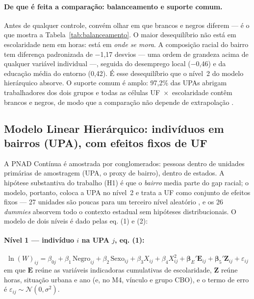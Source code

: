 \documentclass[12pt, a4paper, oneside]{article}
\let\oldsubsectionFB\subsection
\renewcommand{\subsection}{\FloatBarrier\oldsubsectionFB}
\begin{document}
\paragraph{De que é feita a comparação: balanceamento e suporte comum.}
Antes de qualquer controle, convém olhar em que brancos e negros diferem --- é o que
mostra a Tabela~\ref{tab:balanceamento}. O maior desequilíbrio não está em escolaridade
nem em horas: está em \emph{onde se mora}. A composição racial do bairro tem diferença
padronizada de −1,17 desvios --- uma ordem de grandeza acima de qualquer variável
individual ---, seguida do desemprego local (−0,46) e da educação média do entorno
(0,42). É esse desequilíbrio que o nível~2 do modelo hierárquico absorve.
O suporte comum é amplo: 97,2\% das UPAs abrigam trabalhadores dos dois
grupos e todas as células UF~$\times$~escolaridade contêm brancos e negros, de modo que a
comparação não depende de extrapolação \cite{angrist2009}.


\subsection{Modelo Linear Hierárquico: indivíduos em bairros (UPA), com efeitos fixos de UF}
\label{subsec:hlm}

A PNAD Contínua é amostrada por conglomerados: pessoas dentro de unidades primárias de
amostragem (UPA, o proxy de bairro), dentro de estados. A hipótese substantiva do
trabalho (H1) é que o \emph{bairro} media parte do gap racial; o modelo, portanto, coloca
a UPA no nível~2 e trata a UF como conjunto de efeitos fixos --- 27 unidades são poucas para
um terceiro nível aleatório \cite{angrist2009}, e os 26 \emph{dummies} absorvem todo o
contexto estadual sem hipóteses distribucionais. O modelo de dois níveis é dado pelas eq. (1) e (2):

\paragraph{Nível 1 --- indivíduo $i$ na UPA $j$, eq. (1):}
\begin{equation}
  \ln(W)_{ij} = \beta_{0j} + \beta_1\,\text{Negro}_{ij} + \beta_2\,\text{Sexo}_{ij}
  + \beta_3 X_{ij} + \beta_4 X^2_{ij} + \boldsymbol{\beta}_{E}'\mathbf{E}_{ij}
  + \boldsymbol{\beta}_{5}'\mathbf{Z}_{ij} + \varepsilon_{ij}
  \label{eq:nivel1}
\end{equation}
em que $\mathbf{E}$ reúne as variáveis indicadoras cumulativas de escolaridade, $\mathbf{Z}$
reúne horas, situação urbana e ano (e, no M4, vínculo e grupo CBO), e o termo de erro é $\varepsilon_{ij}\sim\mathcal{N}(0,\sigma^2)$.
\end{document}
